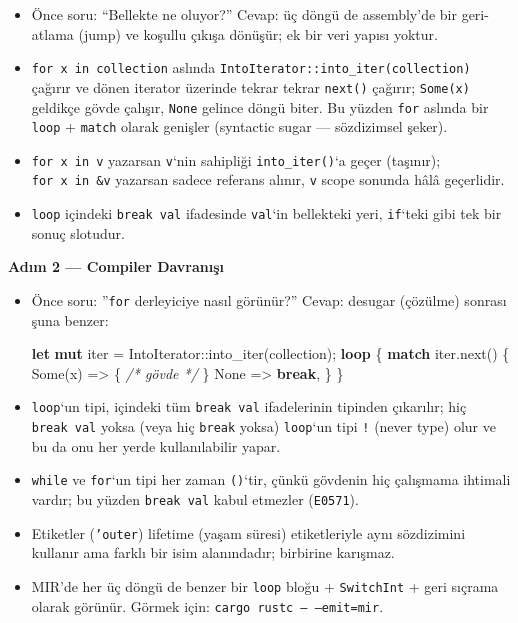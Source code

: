 \documentclass[12pt,a4paper]{article}
\newenvironment{Shaded}{}{}
\newcommand{\CommentTok}[1]{\textcolor[rgb]{0.38,0.63,0.69}{\textit{#1}}}
\newcommand{\ConstantTok}[1]{\textcolor[rgb]{0.53,0.00,0.00}{#1}}
\newcommand{\ControlFlowTok}[1]{\textcolor[rgb]{0.00,0.44,0.13}{\textbf{#1}}}
\newcommand{\FunctionTok}[1]{\textcolor[rgb]{0.02,0.16,0.49}{#1}}
\newcommand{\KeywordTok}[1]{\textcolor[rgb]{0.00,0.44,0.13}{\textbf{#1}}}
\newcommand{\NormalTok}[1]{#1}
\newcommand{\OperatorTok}[1]{\textcolor[rgb]{0.40,0.40,0.40}{#1}}
\begin{document}
\begin{itemize}
\tightlist
\item
  Önce soru: ``Bellekte ne oluyor?'' Cevap: üç döngü de assembly'de bir geri-atlama (jump) ve koşullu çıkışa dönüşür; ek bir veri yapısı yoktur.
\item
  \texttt{for\ x\ in\ collection} aslında \texttt{IntoIterator::into\_iter(collection)} çağırır ve dönen iterator üzerinde tekrar tekrar \texttt{next()} çağırır; \texttt{Some(x)} geldikçe gövde çalışır, \texttt{None} gelince döngü biter. Bu yüzden \texttt{for} aslında bir \texttt{loop} + \texttt{match} olarak genişler (syntactic sugar --- sözdizimsel şeker).
\item
  \texttt{for\ x\ in\ v} yazarsan \texttt{v}`nin sahipliği \texttt{into\_iter()}`a geçer (taşınır); \texttt{for\ x\ in\ \&v} yazarsan sadece referans alınır, \texttt{v} scope sonunda hâlâ geçerlidir.
\item
  \texttt{loop} içindeki \texttt{break\ val} ifadesinde \texttt{val}`in bellekteki yeri, \texttt{if}`teki gibi tek bir sonuç slotudur.
\end{itemize}

\textbf{Adım 2 --- Compiler Davranışı}

\begin{itemize}
\tightlist
\item
  Önce soru: ''\texttt{for} derleyiciye nasıl görünür?'' Cevap: desugar (çözülme) sonrası şuna benzer:

\begin{Shaded}
\begin{Highlighting}[]
\KeywordTok{let} \KeywordTok{mut}\NormalTok{ iter }\OperatorTok{=}\NormalTok{ IntoIterator}\OperatorTok{::}\FunctionTok{into\_iter}\OperatorTok{(}\NormalTok{collection}\OperatorTok{);}
\ControlFlowTok{loop} \OperatorTok{\{}
    \ControlFlowTok{match}\NormalTok{ iter}\OperatorTok{.}\FunctionTok{next}\OperatorTok{()} \OperatorTok{\{}
        \ConstantTok{Some}\OperatorTok{(}\NormalTok{x}\OperatorTok{)} \OperatorTok{=\textgreater{}} \OperatorTok{\{} \CommentTok{/* gövde */} \OperatorTok{\}}
        \ConstantTok{None} \OperatorTok{=\textgreater{}} \ControlFlowTok{break}\OperatorTok{,}
    \OperatorTok{\}}
\OperatorTok{\}}
\end{Highlighting}
\end{Shaded}
\item
  \texttt{loop}`un tipi, içindeki tüm \texttt{break\ val} ifadelerinin tipinden çıkarılır; hiç \texttt{break\ val} yoksa (veya hiç \texttt{break} yoksa) \texttt{loop}`un tipi \texttt{!} (never type) olur ve bu da onu her yerde kullanılabilir yapar.
\item
  \texttt{while} ve \texttt{for}`un tipi her zaman \texttt{()}`tir, çünkü gövdenin hiç çalışmama ihtimali vardır; bu yüzden \texttt{break\ val} kabul etmezler (\texttt{E0571}).
\item
  Etiketler (\texttt{'outer}) lifetime (yaşam süresi) etiketleriyle aynı sözdizimini kullanır ama farklı bir isim alanındadır; birbirine karışmaz.
\item
  MIR'de her üç döngü de benzer bir \texttt{loop} bloğu + \texttt{SwitchInt} + geri sıçrama olarak görünür. Görmek için: \texttt{cargo\ rustc\ --\ --emit=mir}.
\end{itemize}
\end{document}
